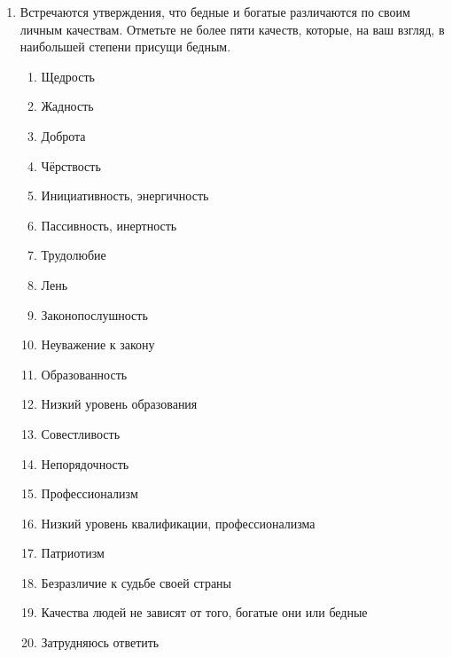 \begin{enumerate}
    \item Встречаются утверждения, что бедные и богатые различаются по своим 
        личным качествам. Отметьте не более пяти качеств, которые, на ваш 
        взгляд, в наибольшей степени присущи бедным.
    \begin{enumerate}
        \item[\dline] Щедрость
        \item[\dline] Жадность
        \item[\dline] Доброта
        \item[\dline] Чёрствость
        \item[\dline] Инициативность, энергичность
        \item[\dline] Пассивность, инертность
        \item[\dline] Трудолюбие
        \item[\dline] Лень
        \item[\dline] Законопослушность
        \item[\dline] Неуважение к закону
        \item[\dline] Образованность
        \item[\dline] Низкий уровень образования
        \item[\dline] Совестливость
        \item[\dline] Непорядочность
        \item[\dline] Профессионализм
        \item[\dline] Низкий уровень квалификации, профессионализма
        \item[\dline] Патриотизм
        \item[\dline] Безразличие к судьбе своей страны
        \item[\dline] Качества людей не зависят от того, богатые они или 
            бедные
        \item[\dline] Затрудняюсь ответить
    \end{enumerate}


\end{enumerate}
